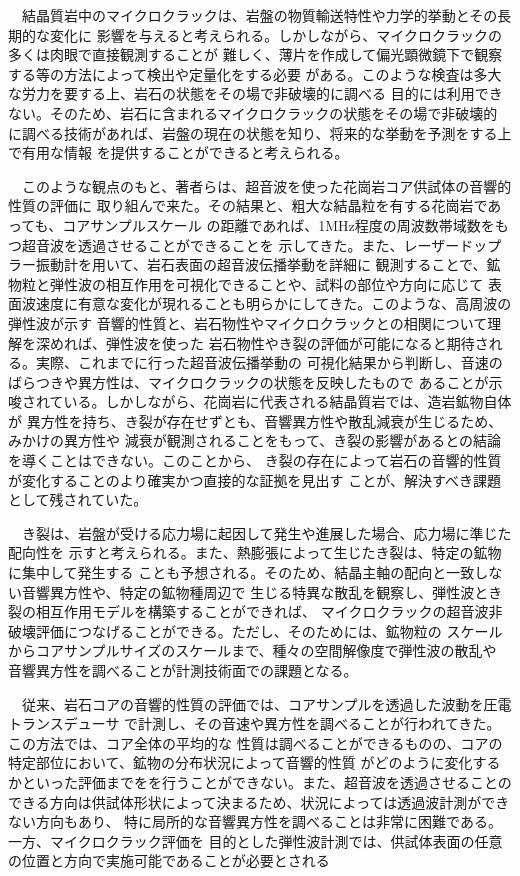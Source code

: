 ﻿　結晶質岩中のマイクロクラックは、岩盤の物質輸送特性や力学的挙動とその長期的な変化に
影響を与えると考えられる。しかしながら、マイクロクラックの多くは肉眼で直接観測することが
難しく、薄片を作成して偏光顕微鏡下で観察する等の方法によって検出や定量化をする必要
がある。このような検査は多大な労力を要する上、岩石の状態をその場で非破壊的に調べる
目的には利用できない。そのため、岩石に含まれるマイクロクラックの状態をその場で非破壊的
に調べる技術があれば、岩盤の現在の状態を知り、将来的な挙動を予測をする上で有用な情報
を提供することができると考えられる。

　このような観点のもと、著者らは、超音波を使った花崗岩コア供試体の音響的性質の評価に
取り組んで来た。その結果と、粗大な結晶粒を有する花崗岩であっても、コアサンプルスケール
の距離であれば、1MHz程度の周波数帯域数をもつ超音波を透過させることができることを
示してきた。また、レーザードップラー振動計を用いて、岩石表面の超音波伝播挙動を詳細に
観測することで、鉱物粒と弾性波の相互作用を可視化できることや、試料の部位や方向に応じて
表面波速度に有意な変化が現れることも明らかにしてきた。このような、高周波の弾性波が示す
音響的性質と、岩石物性やマイクロクラックとの相関について理解を深めれば、弾性波を使った
岩石物性やき裂の評価が可能になると期待される。実際、これまでに行った超音波伝播挙動の
可視化結果から判断し、音速のばらつきや異方性は、マイクロクラックの状態を反映したもので
あることが示唆されている。しかしながら、花崗岩に代表される結晶質岩では、造岩鉱物自体が
異方性を持ち、き裂が存在せずとも、音響異方性や散乱減衰が生じるため、みかけの異方性や
減衰が観測されることをもって、き裂の影響があるとの結論を導くことはできない。このことから、
き裂の存在によって岩石の音響的性質が変化することのより確実かつ直接的な証拠を見出す
ことが、解決すべき課題として残されていた。

　き裂は、岩盤が受ける応力場に起因して発生や進展した場合、応力場に準じた配向性を
示すと考えられる。また、熱膨張によって生じたき裂は、特定の鉱物に集中して発生する
ことも予想される。そのため、結晶主軸の配向と一致しない音響異方性や、特定の鉱物種周辺で
生じる特異な散乱を観察し、弾性波とき裂の相互作用モデルを構築することができれば、
マイクロクラックの超音波非破壊評価につなげることができる。ただし、そのためには、鉱物粒の
スケールからコアサンプルサイズのスケールまで、種々の空間解像度で弾性波の散乱や
音響異方性を調べることが計測技術面での課題となる。

　従来、岩石コアの音響的性質の評価では、コアサンプルを透過した波動を圧電トランスデューサ
で計測し、その音速や異方性を調べることが行われてきた。この方法では、コア全体の平均的な
性質は調べることができるものの、コアの特定部位において、鉱物の分布状況によって音響的性質
がどのように変化するかといった評価までをを行うことができない。また、超音波を透過させることの
できる方向は供試体形状によって決まるため、状況によっては透過波計測ができない方向もあり、
特に局所的な音響異方性を調べることは非常に困難である。一方、マイクロクラック評価を
目的とした弾性波計測では、供試体表面の任意の位置と方向で実施可能であることが必要とされる

